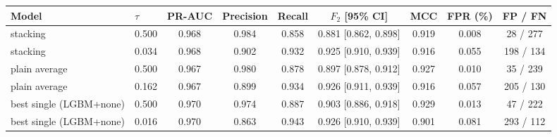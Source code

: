 \begin{tabular}{llccccccc}
\hline
Model & $\tau$ & PR-AUC & Precision & Recall & $F_2$ [95\% CI] & MCC & FPR (\%) & FP / FN \\
\hline
stacking & 0.500 & 0.968 & 0.984 & 0.858 & 0.881 [0.862, 0.898] & 0.919 & 0.008 & 28 / 277 \\
stacking & 0.034 & 0.968 & 0.902 & 0.932 & 0.925 [0.910, 0.939] & 0.916 & 0.055 & 198 / 134 \\
plain average & 0.500 & 0.967 & 0.980 & 0.878 & 0.897 [0.878, 0.912] & 0.927 & 0.010 & 35 / 239 \\
plain average & 0.162 & 0.967 & 0.899 & 0.934 & 0.926 [0.911, 0.939] & 0.916 & 0.057 & 205 / 130 \\
best single (LGBM+none) & 0.500 & 0.970 & 0.974 & 0.887 & 0.903 [0.886, 0.918] & 0.929 & 0.013 & 47 / 222 \\
best single (LGBM+none) & 0.016 & 0.970 & 0.863 & 0.943 & 0.926 [0.910, 0.939] & 0.901 & 0.081 & 293 / 112 \\
\hline
\end{tabular}
